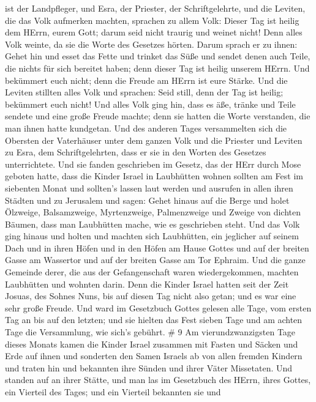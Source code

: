 ist der Landpfleger, und Esra, der Priester, der Schriftgelehrte, und
die Leviten, die das Volk aufmerken machten, sprachen zu allem Volk:
Dieser Tag ist heilig dem HErrn, eurem Gott; darum seid nicht traurig
und weinet nicht! Denn alles Volk weinte, da sie die Worte des Gesetzes
hörten.  Darum sprach er zu ihnen: Gehet hin und esset das
Fette und trinket das Süße und sendet denen auch Teile, die nichts für
sich bereitet haben; denn dieser Tag ist heilig unserem HErrn. Und
bekümmert euch nicht; denn die Freude am HErrn ist eure Stärke.
 Und die Leviten stillten alles Volk und sprachen: Seid
still, denn der Tag ist heilig; bekümmert euch nicht!  Und
alles Volk ging hin, dass es äße, tränke und Teile sendete und eine
große Freude machte; denn sie hatten die Worte verstanden, die man ihnen
hatte kundgetan.  Und des anderen Tages versammelten sich
die Obersten der Vaterhäuser unter dem ganzen Volk und die Priester und
Leviten zu Esra, dem Schriftgelehrten, dass er sie in den Worten des
Gesetzes unterrichtete.  Und sie fanden geschrieben im
Gesetz, das der HErr durch Mose geboten hatte, dass die Kinder Israel in
Laubhütten wohnen sollten am Fest im siebenten Monat  und
sollten's lassen laut werden und ausrufen in allen ihren Städten und zu
Jerusalem und sagen: Gehet hinaus auf die Berge und holet Ölzweige,
Balsamzweige, Myrtenzweige, Palmenzweige und Zweige von dichten Bäumen,
dass man Laubhütten mache, wie es geschrieben steht.  Und
das Volk ging hinaus und holten und machten sich Laubhütten, ein
jeglicher auf seinem Dach und in ihren Höfen und in den Höfen am Hause
Gottes und auf der breiten Gasse am Wassertor und auf der breiten Gasse
am Tor Ephraim.  Und die ganze Gemeinde derer, die aus der
Gefangenschaft waren wiedergekommen, machten Laubhütten und wohnten
darin. Denn die Kinder Israel hatten seit der Zeit Josuas, des Sohnes
Nuns, bis auf diesen Tag nicht also getan; und es war eine sehr große
Freude.  Und ward im Gesetzbuch Gottes gelesen alle Tage,
vom ersten Tag an bis auf den letzten; und sie hielten das Fest sieben
Tage und am achten Tage die Versammlung, wie sich's gebührt. \# 9
 Am vierundzwanzigsten Tage dieses Monats kamen die Kinder
Israel zusammen mit Fasten und Säcken und Erde auf ihnen 
und sonderten den Samen Israels ab von allen fremden Kindern und traten
hin und bekannten ihre Sünden und ihrer Väter Missetaten. 
Und standen auf an ihrer Stätte, und man las im Gesetzbuch des HErrn,
ihres Gottes, ein Vierteil des Tages; und ein Vierteil bekannten sie und

